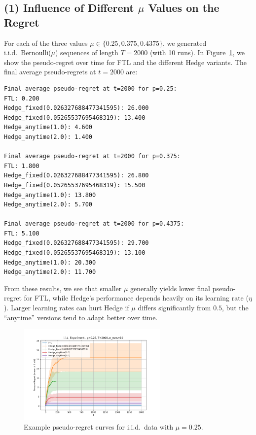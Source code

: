 \subsection{(1) Influence of Different \texorpdfstring{$\mu$}{mu} Values on the Regret}

For each of the three values $\mu \in \{0.25,0.375,0.4375\}$, we generated i.i.d.\ Bernoulli($\mu$) sequences of length $T=2000$ (with 10 runs). In Figure~\ref{fig:plots_iid}, we show the pseudo-regret over time for FTL and the different Hedge variants. The final average pseudo-regrets at $t=2000$ are:
\begin{verbatim} 
Final average pseudo-regret at t=2000 for p=0.25: 
FTL: 0.200 
Hedge_fixed(0.026327688477341595): 26.000 
Hedge_fixed(0.05265537695468319): 13.400 
Hedge_anytime(1.0): 4.600 
Hedge_anytime(2.0): 1.400

Final average pseudo-regret at t=2000 for p=0.375: 
FTL: 1.800 
Hedge_fixed(0.026327688477341595): 26.800 
Hedge_fixed(0.05265537695468319): 15.500 
Hedge_anytime(1.0): 13.800 
Hedge_anytime(2.0): 5.700

Final average pseudo-regret at t=2000 for p=0.4375: 
FTL: 5.100 
Hedge_fixed(0.026327688477341595): 29.700 
Hedge_fixed(0.05265537695468319): 13.100 
Hedge_anytime(1.0): 20.300 
Hedge_anytime(2.0): 11.700 
\end{verbatim}

From these results, we see that smaller $\mu$ generally yields lower final pseudo-regret for FTL, while Hedge’s performance depends heavily on its learning rate ($\eta$). Larger learning rates can hurt Hedge if $\mu$ differs significantly from $0.5$, but the “anytime” versions tend to adapt better over time.

\begin{figure}[h!] 
    \centering 
    \includegraphics[width=0.65\textwidth]{Code/Figure_1.png}
    \caption{Example pseudo-regret curves for i.i.d.\ data with $\mu=0.25$.} 
    \label{fig:plots_iid} 
\end{figure}

